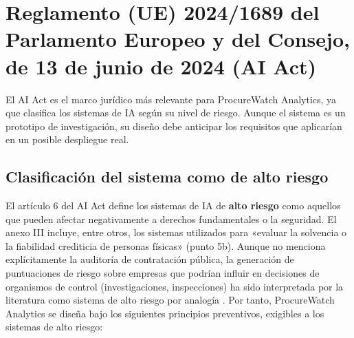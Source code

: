 \documentclass[11pt,a4paper,spanish]{book}
\numberwithin{equation}{chapter}
\numberwithin{figure}{chapter}
\begin{document}
\section{Reglamento (UE) 2024/1689 del Parlamento Europeo y del Consejo, de 13 de junio de 2024 (AI Act)}

El AI Act \cite{AIAct2024} es el marco jurídico más relevante para ProcureWatch Analytics, ya que clasifica los sistemas de IA según su nivel de riesgo. Aunque el sistema es un prototipo de investigación, su diseño debe anticipar los requisitos que aplicarían en un posible despliegue real.

\subsection{Clasificación del sistema como de alto riesgo}

El artículo 6 del AI Act define los sistemas de IA de \textbf{alto riesgo} como aquellos que pueden afectar negativamente a derechos fundamentales o la seguridad. El anexo III incluye, entre otros, los sistemas utilizados para «evaluar la solvencia o la fiabilidad crediticia de personas físicas» (punto 5b). Aunque no menciona explícitamente la auditoría de contratación pública, la generación de puntuaciones de riesgo sobre empresas que podrían influir en decisiones de organismos de control (investigaciones, inspecciones) ha sido interpretada por la literatura como sistema de alto riesgo por analogía \cite{Wachs2025ML, SHAPLIMEWiley2025}. Por tanto, ProcureWatch Analytics se diseña bajo los siguientes principios preventivos, exigibles a los sistemas de alto riesgo:
\end{document}
